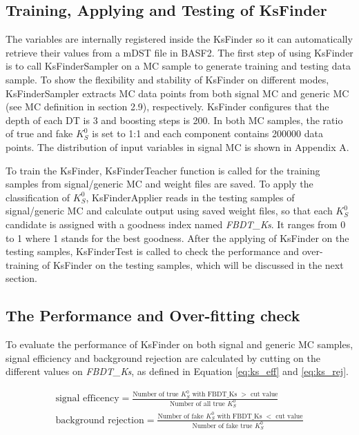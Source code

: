 \subsection{Training, Applying and Testing of KsFinder}
The variables are internally registered inside the KsFinder so it can automatically retrieve their values from a mDST file in BASF2. The first step of using KsFinder is to call KsFinderSampler on a MC sample to generate training and testing data sample. To show the flexibility and stability of KsFinder on different modes, KsFinderSampler extracts MC data points from both signal MC and generic MC (see MC definition in section 2.9), respectively.  KsFinder configures that the depth of each DT is 3 and boosting steps is 200. In both MC samples, the ratio of true and fake $K_S^0$ is set to 1:1 and each component contains 200000 data points. The distribution of input variables in signal MC is shown in Appendix A. 

To train the KsFinder, KsFinderTeacher function is called for the training samples from signal/generic MC and weight files are saved. To apply the classification of $K_S^0$, KsFinderApplier reads in the testing samples of signal/generic MC and calculate output using saved weight files, so that each $K_S^0$ candidate is assigned with a goodness index named \textit{FBDT\_Ks}. It ranges from 0 to 1 where 1 stands for the best goodness. After the applying of KsFinder on the testing samples, KsFinderTest is called to check the performance and over-training of KsFinder on the testing samples, which will be discussed in the next section. 

\subsection{The Performance and Over-fitting check}
To evaluate the performance of KsFinder on both signal and generic MC samples, signal efficiency and background rejection are calculated by cutting on the different values on \textit{FBDT\_Ks}, as defined in Equation \ref{eq:ks_eff} and \ref{eq:ks_rej}.

\begin{eqnarray}
	\text{signal efficency} = \frac{\text{Number of true $K_S^0$ with FBDT\_Ks $>$ cut value}}{\text{Number of all true $K_S^0$ }} \label{eq:ks_eff}\\
	\text{background rejection} = \frac{\text{Number of fake $K_S^0$ with FBDT\_Ks $<$ cut value}}{\text{Number of fake true $K_S^0$ }} \label{eq:ks_rej}
\end{eqnarray}


